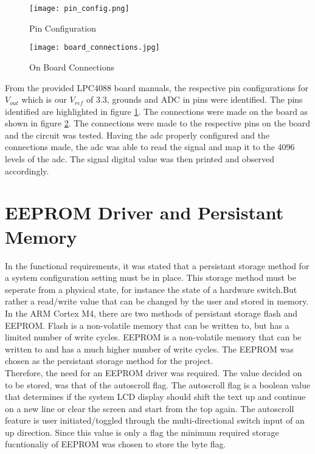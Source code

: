 \documentclass{article}
\begin{document}
\begin{figure}[htpb]
    \centering
    \texttt{[image: pin\_config.png]}
    \caption{Pin Configuration}
    \label{fig8}
\end{figure}

\begin{figure}[htpb]
    \centering
    \texttt{[image: board\_connections.jpg]}
    \caption{On Board Connections}
    \label{fig9}
\end{figure}

From the provided LPC4088 board manuals, the respective pin configurations for $V_{out}$ which is our $V_{ref}$ of 3.3, grounds and ADC in pins were identified. The pins identified are highlighted in figure \ref{fig8}. The connections were made on the board as shown in figure \ref{fig9}. The connections were made to the respective pins on the board and the circuit was tested. Having the adc properly configured and the connections made, the adc was able to read the signal and map it to the 4096 levels of the adc. The signal digital value was then printed and observed accordingly.
\pagebreak

\section{EEPROM Driver and Persistant Memory}
In the functional requirements, it was stated that a persistant storage method for a system configuration setting must be in place. This storage method must be seperate from a physical state, for instance the state of a hardware switch.But rather a read/write value that can be changed by the user and stored in memory.\\

In the ARM Cortex M4, there are two methods of persistant storage flash and EEPROM. Flash is a non-volatile memory that can be written to, but has a limited number of write cycles. EEPROM is a non-volatile memory that can be written to and has a much higher number of write cycles. The EEPROM was chosen as the persistant storage method for the project.\\

Therefore, the need for an EEPROM driver was required. The value decided on to be stored, was that of the autoscroll flag. The autoscroll flag is a boolean value that determines if the system LCD display should shift the text up and continue on a new line or clear the screen and start from the top again. The autoscroll feature is user initiated/toggled through the multi-directional switch input of an up direction. Since this value is only a flag the minimum required storage fucntionaliy of EEPROM was chosen to store the byte flag.\\
\end{document}

